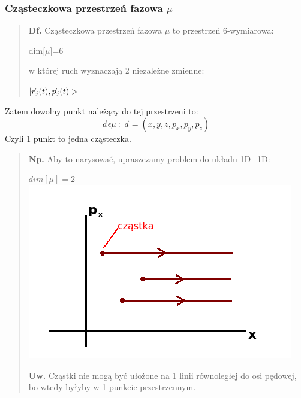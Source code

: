 \subsubsection{Cząsteczkowa przestrzeń fazowa $\mu$}
\begin{verse}\textbf{Df.} Cząsteczkowa przestrzeń fazowa $\mu$ to przestrzeń 6-wymiarowa:\\
\begin{center}dim[$\mu$]=6 \end{center}
w której ruch wyznaczają 2 niezależne zmienne:\\
\begin{center}$|\vec{r}_j(t),\vec{p}_j(t)>$\end{center}\end{verse}
Zatem dowolny punkt należący do tej przestrzeni to:
\begin{equation}\vec{a}\epsilon\mu~:~\vec{a}=(x,y,z,p_x,p_y,p_z)\end{equation}
Czyli 1 punkt to jedna cząsteczka.
\begin{verse}\textbf{Np.} Aby to narysować, upraszczamy problem do układu 1D+1D:\\
\begin{center}$dim[\mu]=2$\\
\includegraphics[scale=0.75] {obrazki/przestrzen_fazowa1.png}
\end{center}
\textbf{Uw.} Cząstki nie mogą być ułożone na 1 linii równoległej do osi pędowej, bo wtedy byłyby w 1 punkcie przestrzennym.
\end{verse}
